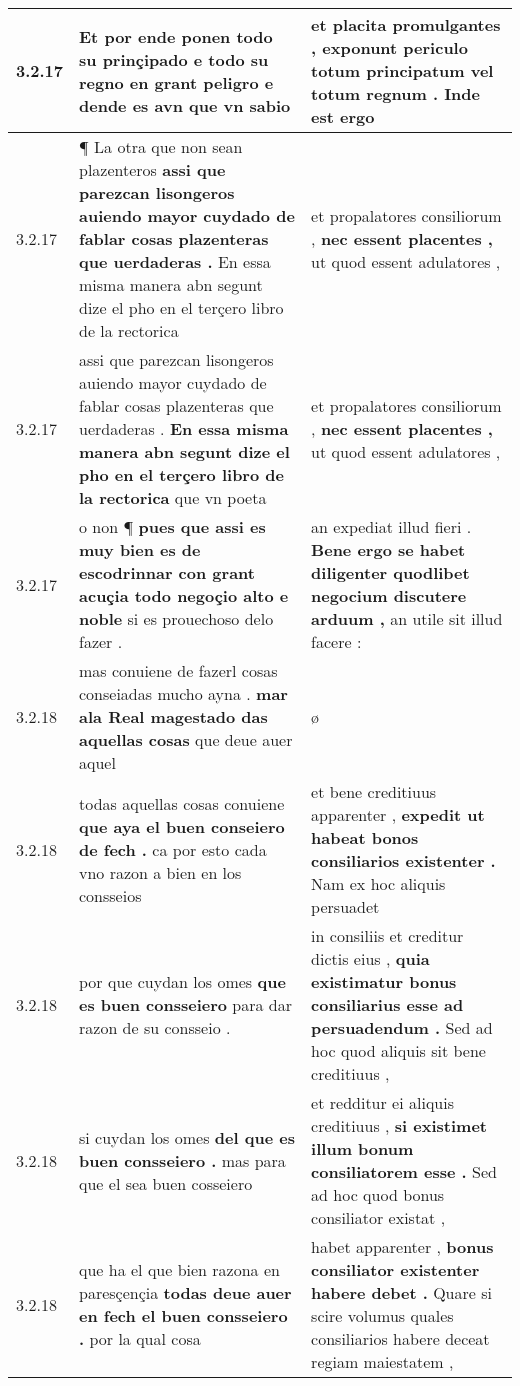 \begin{tabular}{|p{1cm}|p{6.5cm}|p{6.5cm}|}
3.2.17 & Et por ende ponen todo su prinçipado \textbf{ e todo su regno en grant peligro } e dende es avn que vn sabio & et placita promulgantes , \textbf{ exponunt periculo totum principatum } vel totum regnum . Inde est ergo \\\hline
3.2.17 & ¶ La otra que non sean plazenteros \textbf{ assi que parezcan lisongeros auiendo mayor cuydado de fablar cosas plazenteras que uerdaderas . } En essa misma manera abn segunt dize el pho en el terçero libro de la rectorica & et propalatores consiliorum , \textbf{ nec essent placentes , } ut quod essent adulatores , \\\hline
3.2.17 & assi que parezcan lisongeros auiendo mayor cuydado de fablar cosas plazenteras que uerdaderas . \textbf{ En essa misma manera abn segunt dize el pho en el terçero libro de la rectorica } que vn poeta & et propalatores consiliorum , \textbf{ nec essent placentes , } ut quod essent adulatores , \\\hline
3.2.17 & o non ¶ \textbf{ pues que assi es muy bien es de escodrinnar con grant acuçia todo negoçio alto e noble } si es prouechoso delo fazer . & an expediat illud fieri . \textbf{ Bene ergo se habet diligenter quodlibet negocium discutere arduum , } an utile sit illud facere : \\\hline
3.2.18 & mas conuiene de fazerl cosas conseiadas mucho ayna . \textbf{ mar ala Real magestado das aquellas cosas } que deue auer aquel & ø \\\hline
3.2.18 & todas aquellas cosas conuiene \textbf{ que aya el buen conseiero de fech . } ca por esto cada vno razon a bien en los consseios & et bene creditiuus apparenter , \textbf{ expedit ut habeat bonos consiliarios existenter . } Nam ex hoc aliquis persuadet \\\hline
3.2.18 & por que cuydan los omes \textbf{ que es buen consseiero } para dar razon de su consseio . & in consiliis et creditur dictis eius , \textbf{ quia existimatur bonus consiliarius esse ad persuadendum . } Sed ad hoc quod aliquis sit bene creditiuus , \\\hline
3.2.18 & si cuydan los omes \textbf{ del que es buen consseiero . } mas para que el sea buen cosseiero & et redditur ei aliquis creditiuus , \textbf{ si existimet illum bonum consiliatorem esse . } Sed ad hoc quod bonus consiliator existat , \\\hline
3.2.18 & que ha el que bien razona en paresçençia \textbf{ todas deue auer en fech el buen consseiero . } por la qual cosa & habet apparenter , \textbf{ bonus consiliator existenter habere debet . } Quare si scire volumus quales consiliarios habere deceat regiam maiestatem , \\\hline

\end{tabular}
